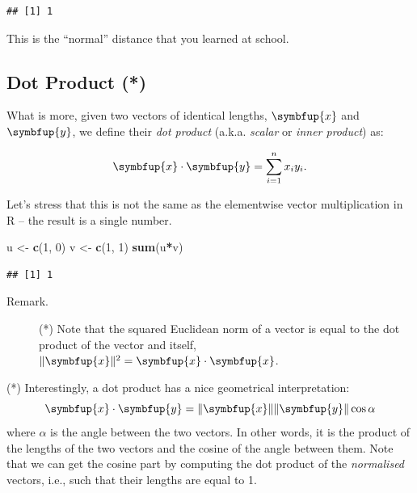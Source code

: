 \documentclass[10pt,b5paper,krantz1]{krantz}
\newenvironment{Shaded}{\begin{snugshade}}{\end{snugshade}}
\newcommand{\DecValTok}[1]{\textcolor[rgb]{0.06,0.06,0.06}{#1}}
\newcommand{\KeywordTok}[1]{\textcolor[rgb]{0.27,0.27,0.27}{\textbf{#1}}}
\newcommand{\NormalTok}[1]{#1}
\newcommand{\OperatorTok}[1]{\textcolor[rgb]{0.43,0.43,0.43}{\textbf{#1}}}
\newcommand{\StringTok}[1]{\textcolor[rgb]{0.5,0.5,0.5}{#1}}
\renewcommand{\boldsymbol}[1]{\symbfup{#1}}
\begin{document}
\begin{verbatim}
## [1] 1
\end{verbatim}

This is the ``normal'' distance that you learned at school.

\hypertarget{dot-product}{%
\subsection{Dot Product (*)}\label{dot-product}}

What is more, given two vectors of identical lengths,
\(\boldsymbol{x}\) and \(\boldsymbol{y}\),
we define their \emph{dot product} (a.k.a. \emph{scalar} or \emph{inner product}) as:

\[
\boldsymbol{x}\cdot\boldsymbol{y} = \sum_{i=1}^n x_i y_i.
\]

Let's stress that this is not the same as the
elementwise vector multiplication in R -- the result is a single number.

\begin{Shaded}
\begin{Highlighting}[]
\NormalTok{u <-}\StringTok{ }\KeywordTok{c}\NormalTok{(}\DecValTok{1}\NormalTok{, }\DecValTok{0}\NormalTok{)}
\NormalTok{v <-}\StringTok{ }\KeywordTok{c}\NormalTok{(}\DecValTok{1}\NormalTok{, }\DecValTok{1}\NormalTok{)}
\KeywordTok{sum}\NormalTok{(u}\OperatorTok{*}\NormalTok{v)}
\end{Highlighting}
\end{Shaded}

\begin{verbatim}
## [1] 1
\end{verbatim}

\begin{description}
\item[Remark.]
(*) Note that the squared Euclidean norm of a vector is equal to the dot
product of the vector and itself,
\(\|\boldsymbol{x}\|^2 = \boldsymbol{x}\cdot\boldsymbol{x}\).
\end{description}

(*) Interestingly, a dot product has a nice geometrical interpretation:
\[
\boldsymbol{x}\cdot\boldsymbol{y} = \|\boldsymbol{x}\| \|\boldsymbol{y}\|
\cos\alpha
\]
where \(\alpha\) is the angle between the two vectors.
In other words, it is the product of the lengths of the two vectors
and the cosine of the angle between them.
Note that we can get the cosine part by computing the dot product
of the \emph{normalised}
vectors, i.e., such that their lengths are equal to 1.
\end{document}
